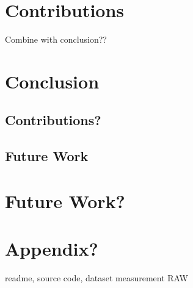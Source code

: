 \documentclass[USenglish]{uit-thesis}
\begin{document}
\chapter{Contributions}
Combine with conclusion??
\chapter{Conclusion}
\section{Contributions?}
\section{Future Work}

\chapter{Future Work?}

\chapter{Appendix?}
readme, source code, dataset measurement RAW
\backmatter



\newpage{}
\end{document}
